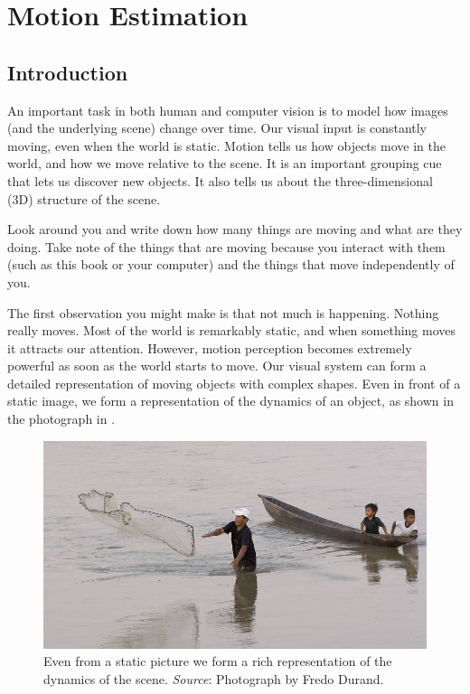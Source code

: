 
\chapter{Motion Estimation}
\label{chapter:motion_estimation}


\section{Introduction}

An important task in both human and computer vision is to model how images (and the underlying scene) change over time. Our visual input is constantly moving, even when the world is static. Motion tells us how objects move in the world, and how we move relative to the scene. It is an important grouping cue that lets us discover new objects. It also tells us about the three-dimensional (3D) structure of the scene.

Look around you and write down how many things are moving and what are they doing. Take note of the things that are moving because you interact with them (such as this book or your computer) and the things that move independently of you. 

The first observation you might make is that not much is happening. Nothing really moves. Most of the world is remarkably static, and when something moves it attracts our attention. However, motion perception becomes extremely powerful as soon as the world starts to move. Our visual system can form a detailed representation of moving objects with complex shapes. Even in front of a static image, we form a representation of the dynamics of an object, as shown in the photograph in \fig{\ref{fig:050822_172806__MG_5366}}. 

\begin{figure}[t]
\centerline{
\includegraphics[width=.7\linewidth]{figures/optical_flow/050822_172806__MG_5366.jpg}
} 
\caption{Even from a static picture we form a rich representation of the dynamics of the scene. {\em Source}: Photograph by Fredo Durand.}
\label{fig:050822_172806__MG_5366}
\end{figure}

